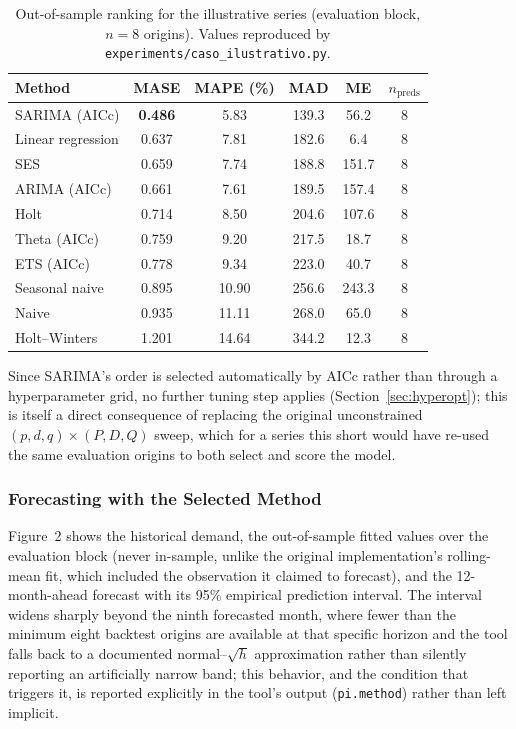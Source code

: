 \documentclass[forecasting,article,submit,pdftex,moreauthors]{Definitions/mdpi}
\begin{document}
\begin{table}[H]
\caption{Out-of-sample ranking for the illustrative series (evaluation block, $n=8$ origins). Values reproduced by \texttt{experiments/caso\_ilustrativo.py}.\label{tab:rankingcaso}}
\centering
\begin{tabularx}{\textwidth}{Xccccc}
\toprule
\textbf{Method} & \textbf{MASE} & \textbf{MAPE (\%)} & \textbf{MAD} & \textbf{ME} & \textbf{$n_{\text{preds}}$} \\
\midrule
SARIMA (AICc)               & \textbf{0.486} & 5.83  & 139.3 & 56.2  & 8 \\
Linear regression            & 0.637 & 7.81  & 182.6 & 6.4   & 8 \\
SES                           & 0.659 & 7.74  & 188.8 & 151.7 & 8 \\
ARIMA (AICc)                  & 0.661 & 7.61  & 189.5 & 157.4 & 8 \\
Holt                          & 0.714 & 8.50  & 204.6 & 107.6 & 8 \\
Theta (AICc)                  & 0.759 & 9.20  & 217.5 & 18.7  & 8 \\
ETS (AICc)                    & 0.778 & 9.34  & 223.0 & 40.7  & 8 \\
Seasonal naive                & 0.895 & 10.90 & 256.6 & 243.3 & 8 \\
Naive                         & 0.935 & 11.11 & 268.0 & 65.0  & 8 \\
Holt--Winters                 & 1.201 & 14.64 & 344.2 & 12.3  & 8 \\
\bottomrule
\end{tabularx}
\end{table}

Since SARIMA's order is selected automatically by AICc rather than through a hyperparameter grid, no further tuning step applies (Section~\ref{sec:hyperopt}); this is itself a direct consequence of replacing the original unconstrained $(p,d,q)\times(P,D,Q)$ sweep, which for a series this short would have re-used the same evaluation origins to both select and score the model.

\subsubsection{Forecasting with the Selected Method}

Figure~2 shows the historical demand, the out-of-sample fitted values over the evaluation block (never in-sample, unlike the original implementation's rolling-mean fit, which included the observation it claimed to forecast), and the 12-month-ahead forecast with its 95\% empirical prediction interval. The interval widens sharply beyond the ninth forecasted month, where fewer than the minimum eight backtest origins are available at that specific horizon and the tool falls back to a documented normal--$\sqrt{h}$ approximation rather than silently reporting an artificially narrow band; this behavior, and the condition that triggers it, is reported explicitly in the tool's output (\texttt{pi.method}) rather than left implicit.
\end{document}
